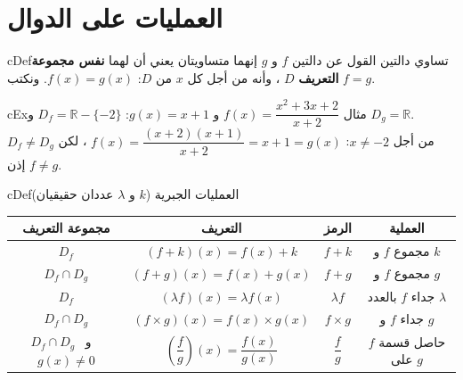 \documentclass[12pt,a4paper]{article}
\newenvironment{BOX}[2]{\begin{otherlanguage}{english}\begin{arbox}{#1}{#2}}{\end{arbox}\end{otherlanguage}}
\newenvironment{tarif}[1][تعريف]{\begin{BOX}{cDef}{#1}}{\end{BOX}}
\newenvironment{mithal}[1][مثال]{\begin{BOX}{cEx}{#1}}{\end{BOX}}
\newcommand{\R}{\mathbb{R}}
\begin{document}
\section{العمليات على الدوال}
\begin{tarif}[تساوي دالتين]
القول عن دالتين $f$ و $g$ إنهما متساويتان يعني أن لهما \textbf{نفس مجموعة التعريف} $D$ ، وأنه من أجل كل $x$ من $D$: $f(x)=g(x)$. ونكتب $f=g$.
\end{tarif}
\begin{mithal}
$f(x)=\dfrac{x^2+3x+2}{x+2}$ و $g(x)=x+1$: \quad $D_f=\R-\{-2\}$ و $D_g=\R$.\\
من أجل $x\neq-2$: $f(x)=\dfrac{(x+2)(x+1)}{x+2}=x+1=g(x)$ ، لكن $D_f\neq D_g$ إذن $f\neq g$.
\end{mithal}
\begin{tarif}[العمليات الجبرية ($k$ و $\lambda$ عددان حقيقيان)]
\begin{center}
\renewcommand{\arraystretch}{1.65}
\begin{tabular}{|C|C|C|C|}\hline
\textbf{مجموعة التعريف} & \textbf{التعريف} & \textbf{الرمز} & \textbf{العملية}\\\hline
$D_f$ & $(f+k)(x)=f(x)+k$ & $f+k$ & مجموع $f$ و $k$\\\hline
$D_f\cap D_g$ & $(f+g)(x)=f(x)+g(x)$ & $f+g$ & مجموع $f$ و $g$\\\hline
$D_f$ & $(\lambda f)(x)=\lambda f(x)$ & $\lambda f$ & جداء $f$ بالعدد $\lambda$\\\hline
$D_f\cap D_g$ & $(f\times g)(x)=f(x)\times g(x)$ & $f\times g$ & جداء $f$ و $g$\\\hline
$D_f\cap D_g$ \ و \ $g(x)\neq0$ & $\left(\dfrac fg\right)(x)=\dfrac{f(x)}{g(x)}$ & $\dfrac fg$ & حاصل قسمة $f$ على $g$\\\hline
\end{tabular}
\end{center}
\end{tarif}

\end{document}
